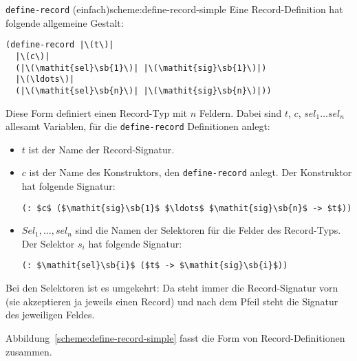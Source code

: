\begin{feature}{\lstinline{define-record} (einfach)}{scheme:define-record-simple}
Eine Record-Definition
hat folgende allgemeine Gestalt:\label{def:define-record}
%
\begin{lstlisting}
(define-record |\(t\)|
  |\(c\)|
  (|\(\mathit{sel}\sb{1}\)| |\(\mathit{sig}\sb{1}\)|)
  |\(\ldots\)|
  (|\(\mathit{sel}\sb{n}\)| |\(\mathit{sig}\sb{n}\)|))
\end{lstlisting}
%
Diese Form definiert einen Record-Typ mit $n$ Feldern.
Dabei sind $t$, $c$, $\mathit{sel}_1 \ldots \mathit{sel}_n$ allesamt Variablen, für die
\lstinline{define-record} Definitionen anlegt:
%
\begin{itemize}
\item $t$ ist der Name der Record-Signatur.
\item $c$ ist der Name des Konstruktors, den
  \lstinline{define-record} anlegt.  Der Konstruktor hat 
  folgende Signatur:
%  
\begin{lstlisting}
(: $c$ ($\mathit{sig}\sb{1}$ $\ldots$ $\mathit{sig}\sb{n}$ -> $t$))
\end{lstlisting}
\item $\mathit{Sel}_1, \ldots, \mathit{sel}_n$ sind die Namen der Selektoren für die Felder
  des Record-Typs.  Der Selektor $s_i$ hat folgende Signatur:
% 
\begin{lstlisting}
(: $\mathit{sel}\sb{i}$ ($t$ -> $\mathit{sig}\sb{i}$))
\end{lstlisting}
\end{itemize}
%
\end{feature}

Bei den Selektoren ist es umgekehrt: Da steht immer die Record-Signatur
vorn (sie akzeptieren ja jeweils einen Record) und nach dem Pfeil
steht die Signatur des jeweiligen Feldes.

Abbildung~\ref{scheme:define-record-simple} fasst die Form
von Record-Definitionen zusammen.

